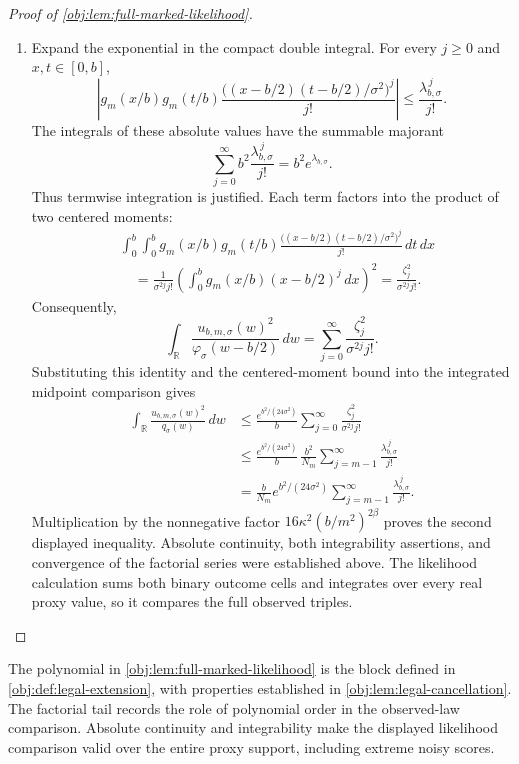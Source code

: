 \documentclass[11pt]{article}
\begin{document}
\begin{proof}[Proof of \cref{obj:lem:full-marked-likelihood}]
\begin{enumerate}
\item Expand the exponential in the compact double integral. For every \(j\ge0\) and \(x,t\in[0,b]\),
\[
\left|
g_m(x/b)g_m(t/b)
\frac{\bigl((x-b/2)(t-b/2)/\sigma^2\bigr)^j}{j!}
\right|
\le\frac{\lambda_{b,\sigma}^{\,j}}{j!}.
\]
The integrals of these absolute values have the summable majorant
\[
\sum_{j=0}^{\infty}
b^2\frac{\lambda_{b,\sigma}^{\,j}}{j!}
=b^2e^{\lambda_{b,\sigma}}.
\]
Thus termwise integration is justified. Each term factors into the product of two centered moments:
\[
\begin{aligned}
&\int_0^b\int_0^b
g_m(x/b)g_m(t/b)
\frac{\bigl((x-b/2)(t-b/2)/\sigma^2\bigr)^j}{j!}\,dt\,dx\\
&\quad=
\frac1{\sigma^{2j}j!}
\left(\int_0^b g_m(x/b)(x-b/2)^j\,dx\right)^2
=\frac{\zeta_j^2}{\sigma^{2j}j!}.
\end{aligned}
\]
Consequently,
\[
\int_{\mathbb R}
\frac{u_{b,m,\sigma}(w)^2}{\varphi_\sigma(w-b/2)}\,dw
=
\sum_{j=0}^{\infty}\frac{\zeta_j^2}{\sigma^{2j}j!}.
\]
Substituting this identity and the centered-moment bound into the integrated midpoint comparison gives
\[
\begin{aligned}
\int_{\mathbb R}\frac{u_{b,m,\sigma}(w)^2}{q_\sigma(w)}\,dw
&\le
\frac{e^{b^2/(24\sigma^2)}}b
\sum_{j=0}^{\infty}\frac{\zeta_j^2}{\sigma^{2j}j!}\\
&\le
\frac{e^{b^2/(24\sigma^2)}}b\,
\frac{b^2}{N_m}
\sum_{j=m-1}^{\infty}\frac{\lambda_{b,\sigma}^{\,j}}{j!}\\
&=
\frac b{N_m}e^{b^2/(24\sigma^2)}
\sum_{j=m-1}^{\infty}\frac{\lambda_{b,\sigma}^{\,j}}{j!}.
\end{aligned}
\]
Multiplication by the nonnegative factor
\(16\kappa^2(b/m^2)^{2\beta}\) proves the second displayed inequality. Absolute continuity, both integrability assertions, and convergence of the factorial series were established above. The likelihood calculation sums both binary outcome cells and integrates over every real proxy value, so it compares the full observed triples.
\end{enumerate}
\end{proof}

The polynomial in \cref{obj:lem:full-marked-likelihood} is the block defined in \cref{obj:def:legal-extension}, with properties established in \cref{obj:lem:legal-cancellation}. The factorial tail records the role of polynomial order in the observed-law comparison. Absolute continuity and integrability make the displayed likelihood comparison valid over the entire proxy support, including extreme noisy scores.
\end{document}
